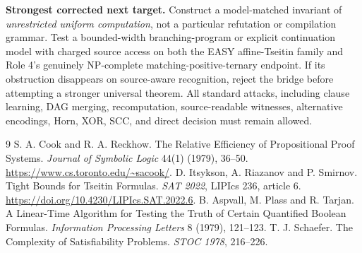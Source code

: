 \documentclass[11pt]{article}
\begin{document}
\noindent\textbf{Strongest corrected next target.}
Construct a model-matched invariant of
\emph{unrestricted uniform computation}, not a
particular refutation or compilation grammar. Test a
bounded-width branching-program or explicit
continuation model with charged source access on both
the EASY affine-Tseitin family and Role 4's genuinely
NP-complete matching-positive-ternary endpoint.
If its obstruction disappears on source-aware
recognition, reject the bridge before attempting
a stronger universal theorem. All standard attacks,
including clause learning, DAG merging, recomputation,
source-readable witnesses, alternative encodings,
Horn, XOR, SCC, and direct decision must remain allowed.

\begin{thebibliography}{9}
 S. A. Cook and R. A. Reckhow.
The Relative Efficiency of Propositional Proof Systems.
\emph{Journal of Symbolic Logic} 44(1) (1979), 36--50.
\url{https://www.cs.toronto.edu/~sacook/}.
 D. Itsykson, A. Riazanov and P. Smirnov.
Tight Bounds for Tseitin Formulas.
\emph{SAT 2022}, LIPIcs 236, article 6.
\url{https://doi.org/10.4230/LIPIcs.SAT.2022.6}.
 B. Aspvall, M. Plass and R. Tarjan.
A Linear-Time Algorithm for Testing the Truth of Certain
Quantified Boolean Formulas. \emph{Information Processing
Letters} 8 (1979), 121--123.
 T. J. Schaefer.
The Complexity of Satisfiability Problems.
\emph{STOC 1978}, 216--226.
\end{thebibliography}
\end{document}

